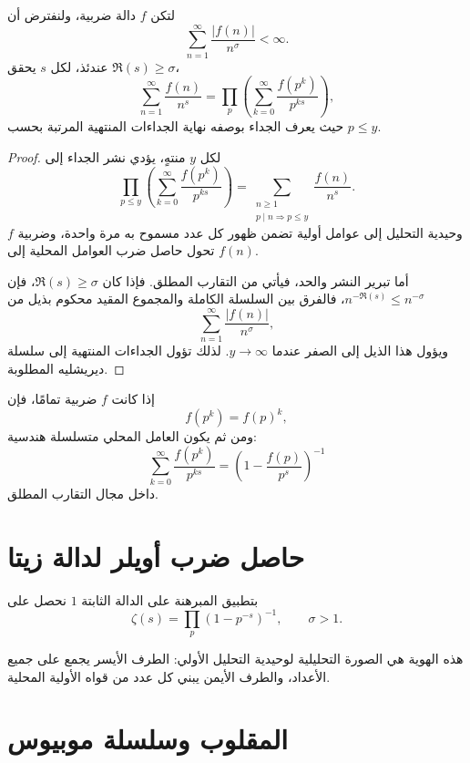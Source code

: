 \begin{theorem}
\label{thm:multiplicative-dirichlet-series-euler-product}
\provedhere
لتكن \(f\) دالة ضربية، ولنفترض أن
\[
\sum_{n=1}^{\infty}\frac{|f(n)|}{n^\sigma}<\infty.
\]
عندئذ، لكل \(s\) يحقق \(\Re(s)\geq\sigma\)،
\[
\sum_{n=1}^{\infty}\frac{f(n)}{n^s}
=
\prod_p
\left(
\sum_{k=0}^{\infty}\frac{f(p^k)}{p^{ks}}
\right),
\]
حيث يعرف الجداء بوصفه نهاية الجداءات المنتهية المرتبة بحسب \(p\leq y\).
\end{theorem}

\begin{proof}
لكل \(y\) منتهٍ، يؤدي نشر الجداء إلى
\[
\prod_{p\leq y}
\left(
\sum_{k=0}^{\infty}\frac{f(p^k)}{p^{ks}}
\right)
=
\sum_{\substack{n\geq1\\p\mid n\Rightarrow p\leq y}}
\frac{f(n)}{n^s}.
\]
وحيدية التحليل إلى عوامل أولية تضمن ظهور كل عدد مسموح به مرة واحدة،
وضربية \(f\) تحول حاصل ضرب العوامل المحلية إلى \(f(n)\).

أما تبرير النشر والحد، فيأتي من التقارب المطلق. فإذا كان
\(\Re(s)\geq\sigma\)، فإن \(n^{-\Re(s)}\leq n^{-\sigma}\)، فالفرق بين السلسلة الكاملة
والمجموع المقيد محكوم بذيل من
\[
\sum_{n=1}^{\infty}\frac{|f(n)|}{n^\sigma},
\]
ويؤول هذا الذيل إلى الصفر عندما \(y\to\infty\). لذلك تؤول الجداءات
المنتهية إلى سلسلة ديريشليه المطلوبة.
\end{proof}

إذا كانت \(f\) ضربية تمامًا، فإن
\[
f(p^k)=f(p)^k,
\]
ومن ثم يكون العامل المحلي متسلسلة هندسية:
\[
\sum_{k=0}^{\infty}\frac{f(p^k)}{p^{ks}}
=
\left(1-\frac{f(p)}{p^s}\right)^{-1}
\]
داخل مجال التقارب المطلق.

\section{حاصل ضرب أويلر لدالة زيتا}

بتطبيق المبرهنة على الدالة الثابتة \(1\) نحصل على
\[
\zeta(s)
=
\prod_p(1-p^{-s})^{-1},
\qquad \sigma>1.
\]

هذه الهوية هي الصورة التحليلية لوحيدية التحليل الأولي: الطرف الأيسر يجمع
على جميع الأعداد، والطرف الأيمن يبني كل عدد من قواه الأولية المحلية.

\section{المقلوب وسلسلة موبيوس}

